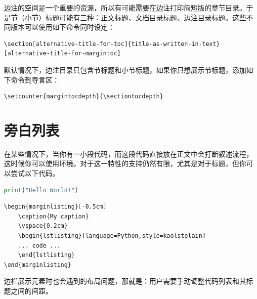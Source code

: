 边注的空间是一个重要的资源，所以有可能需要在边注打印简短版的章节目录。于是节（小节）标题可能有三种：正文标题、文档目录标题、边注目录标题。这些不同版本可以使用如下命令同时设定：

\begin{lstlisting}[style=kaolstplain]
\section[alternative-title-for-toc]{title-as-written-in-text}[alternative-title-for-margintoc]
\end{lstlisting}

默认情况下，边注目录只包含节标题和小节标题，如果你只想展示节标题，添加如下命令到导言区：

\begin{lstlisting}[style=kaolstplain]
\setcounter{margintocdepth}{\sectiontocdepth}
\end{lstlisting}

\section{旁白列表}

在某些情况下，当你有一小段代码，而这段代码直接放在正文中会打断叙述流程，这时候你可以使用环境。对于这一特性的支持仍然有限，尤其是对于标题，但你可以尝试以下代码。

\begin{marginlisting}[-1.35cm]
	\caption{An example of a margin listing.}
	\vspace{0.6cm}
	\begin{lstlisting}[language=Python,style=kaolstplain]
print("Hello World!")
	\end{lstlisting}
\end{marginlisting}

\begin{verbatim}
\begin{marginlisting}[-0.5cm]
	\caption{My caption}
	\vspace{0.2cm}
	\begin{lstlisting}[language=Python,style=kaolstplain]
	... code ...
	\end{lstlisting}
\end{marginlisting}
\end{verbatim}

边栏展示元素时也会遇到的布局问题，那就是：用户需要手动调整代码列表和其标题之间的间距。
